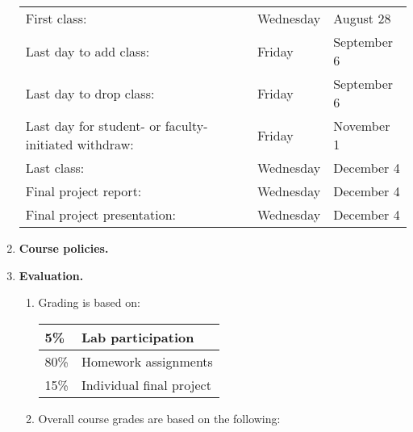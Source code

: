\documentclass[10pt,titlepage,fleqn]{article}
\begin{document}
\begin{enumerate}
\begin{tabular}{lll}
\hline
First class:                                        & Wednesday & August 28 \\
Last day to add class:                              & Friday & September 6 \\
Last day to drop class:                             & Friday & September 6 \\
Last day for student- or faculty-initiated withdraw: & Friday & November 1 \\
Last class:                                         & Wednesday & December 4 \\
Final project report:                               & Wednesday & December 4 \\
Final project presentation:                         & Wednesday & December 4 \\
\hline
\end{tabular}

\item {\bf Course policies.}



\item {\bf Evaluation.}

\begin{enumerate}

\item Grading is based on:

\begin{tabular}{|l|l|}
\hline
5\% & Lab participation \\ \hline
80\% & Homework assignments \\ \hline
15\% & Individual final project \\ \hline
\end{tabular}

\bigskip
\item Overall course grades are based on the following:


\end{enumerate}
\end{enumerate}
\end{document}
